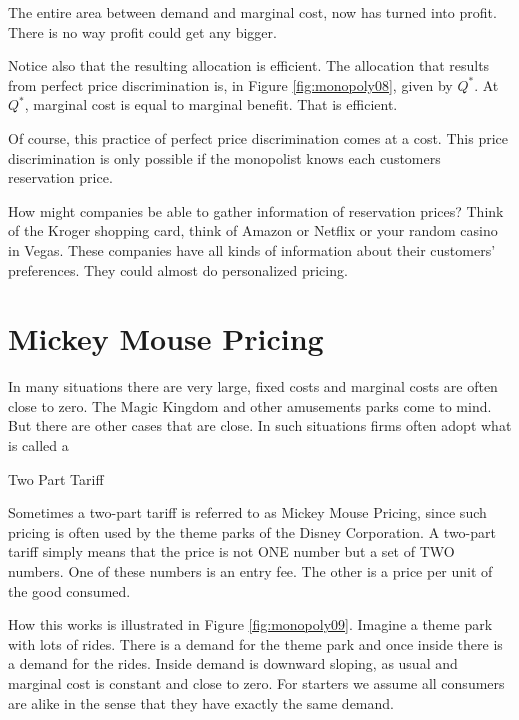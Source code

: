 \documentclass[
]{book}
\begin{document}
The entire area between demand and marginal cost, now has turned into profit. There is no way profit could get any bigger.

Notice also that the resulting allocation is efficient. The allocation that results from perfect price discrimination is, in Figure \ref{fig:monopoly08}, given by \(Q^*\). At \(Q^*\), marginal cost is equal to marginal benefit. That is efficient.

Of course, this practice of perfect price discrimination comes at a cost. This price discrimination is only possible if the monopolist knows each customers reservation price.

How might companies be able to gather information of reservation prices? Think of the Kroger shopping card, think of Amazon or Netflix or your random casino in Vegas. These companies have all kinds of information about their customers' preferences. They could almost do personalized pricing.

\hypertarget{mickey-mouse-pricing}{%
\section{Mickey Mouse Pricing}\label{mickey-mouse-pricing}}

In many situations there are very large, fixed costs and marginal costs are often close to zero. The Magic Kingdom and other amusements parks come to mind. But there are other cases that are close. In such situations firms often adopt what is called a

\begin{center}
Two Part Tariff

\end{center}

Sometimes a two-part tariff is referred to as Mickey Mouse Pricing, since such pricing is often used by the theme parks of the Disney Corporation. A two-part tariff simply means that the price is not ONE number but a set of TWO numbers. One of these numbers is an entry fee. The other is a price per unit of the good consumed.

How this works is illustrated in Figure \ref{fig:monopoly09}. Imagine a theme park with lots of rides. There is a demand for the theme park and once inside there is a demand for the rides. Inside demand is downward sloping, as usual and marginal cost is constant and close to zero. For starters we assume all consumers are alike in the sense that they have exactly the same demand.
\end{document}
